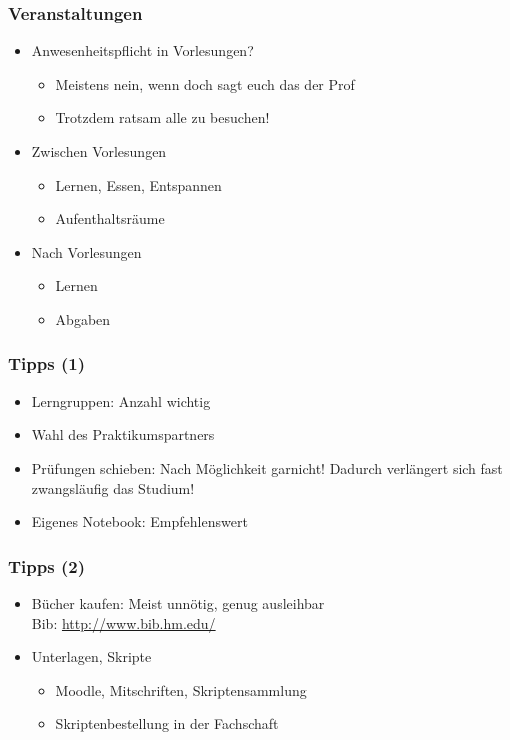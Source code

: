 \documentclass{beamer}
\begin{document}
\begin{frame}
\frametitle{Veranstaltungen}
\begin{itemize}
	\item Anwesenheitspflicht in Vorlesungen?
		\begin{itemize}
			\item Meistens nein, wenn doch sagt euch das der Prof
			\item Trotzdem ratsam alle zu besuchen!
		\end{itemize}
	\pause
	\item Zwischen Vorlesungen
		\begin{itemize}
			\item Lernen, Essen, Entspannen
			\item Aufenthaltsräume
		\end{itemize}
	\pause
	\item Nach Vorlesungen
		\begin{itemize}
			\item Lernen
			\item Abgaben
		\end{itemize}
\end{itemize}
\end{frame}


\begin{frame}
\frametitle{Tipps (1)}
\begin{itemize}
	\item Lerngruppen: Anzahl wichtig
	\pause
	\item Wahl des Praktikumspartners
	\pause
	\item Prüfungen schieben: Nach Möglichkeit garnicht! Dadurch verlängert sich fast zwangsläufig das Studium!
	\pause
	\item Eigenes Notebook: Empfehlenswert
\end{itemize}
\end{frame}


\begin{frame}
\frametitle{Tipps (2)}
\begin{itemize}
	\item Bücher kaufen: Meist unnötig, genug ausleihbar\\
		\footnotesize Bib: \url{http://www.bib.hm.edu/}\small
	\pause
	\item Unterlagen, Skripte
		\begin{itemize}
			\item Moodle, Mitschriften, Skriptensammlung
			\item Skriptenbestellung in der Fachschaft
		\end{itemize}
\end{itemize}
\end{frame}
\end{document}
